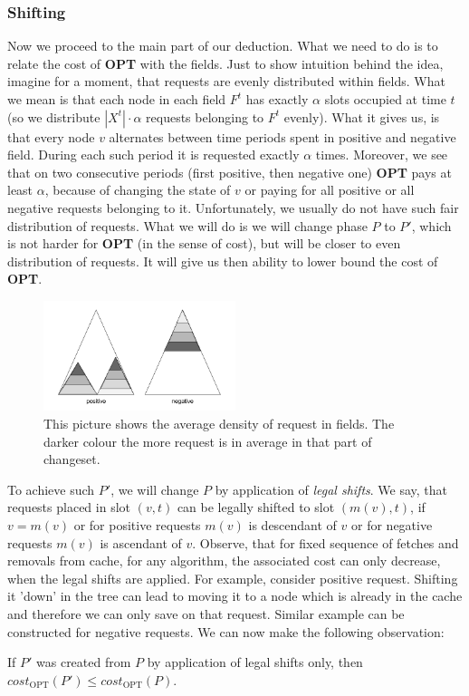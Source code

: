 \subsubsection{Shifting}
Now we proceed to the main part of our deduction. What we need to do is to 
relate the cost of \textbf{OPT} with the fields. Just to show intuition behind the 
idea, imagine 
for a moment, that requests are evenly distributed within fields. What we mean
is that each node in each field $F^t$ has exactly $\alpha$ slots 
occupied at time $t$ (so we distribute $|X^t| \cdot \alpha$ requests belonging 
to $F^t$ evenly). What it gives us, is that every node $v$ alternates between 
time periods spent in positive and negative field. During each such period it is 
requested exactly $\alpha$ times. Moreover, we see that on two consecutive 
periods (first positive, then negative one) \textbf{OPT} pays at least $\alpha$, 
because of changing 
the state of $v$ or paying for all positive or all negative requests belonging to it. 
Unfortunately, we usually do not have such fair distribution of requests. What we 
will do is 
we will change phase $P$ to $P'$, which is not harder for \textbf{OPT} (in the sense
of cost), but will be closer to even distribution of requests. It will give us then 
ability to lower bound the cost of \textbf{OPT}.
\begin{figure}
\vspace{-20pt}
 \begin{center}
  \includegraphics[width=0.5\textwidth]{density_pic.png}
\end{center}
\caption{This picture shows the average density of request in fields. The 
darker colour the more request is in average in that part of changeset.}
\vspace{-10pt}
\label{fig:density}
\end{figure}

To achieve such $P'$, we will change $P$ by application of \textit{legal shifts}. 
We say, that requests placed in slot $(v, t)$ can be legally shifted to slot $(m(v), t)$,
if $v = m(v)$ or for positive requests $m(v)$ is descendant of $v$ or for negative 
requests $m(v)$ is ascendant of $v$. Observe, that for fixed sequence of fetches 
and removals from cache, for any algorithm, the associated cost can only decrease, 
when the legal shifts are applied. For example, consider positive request. 
Shifting it 'down' in the tree can lead to moving it to a node which is already 
in the cache and therefore we can only save on that request. Similar example can 
be constructed for negative requests. We can now make the following observation:
\begin{observe}
If $P'$ was created from $P$ by application of legal shifts only, then 
$cost_{\mathrm{OPT}}(P') \leq cost_{\mathrm{OPT}}(P)$.
\end{observe}

